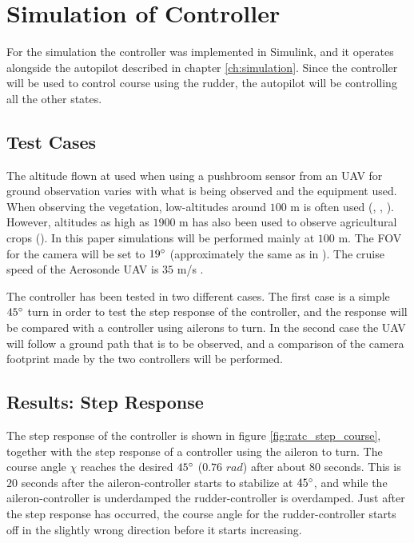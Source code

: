 \section{Simulation of Controller}
\label{ch:controller_sim}

For the simulation the controller was implemented in Simulink, and it operates alongside the autopilot described in chapter \ref{ch:simulation}. Since the controller will be used to control course using the rudder, the autopilot will be controlling all the other states.


\subsection{Test Cases}

The altitude flown at used when using a pushbroom sensor from an UAV for ground observation varies with what is being observed and the equipment used. When observing the vegetation, low-altitudes around $100$ m is often used (\cite{hymsySUOMALAINEN}, \cite{wheatLELONG}, \cite{lowRAMIREZ}). However, altitudes as high as $1900$ m has also been used to observe agricultural crops (\cite{mosaicASMAT}). In this paper simulations will be performed mainly at $100$ m. The FOV for the camera will be set to $19\degree$ (approximately the same as in \cite{hymsySUOMALAINEN}). The cruise speed of the Aerosonde UAV is $35$ m/s \cite{suaBEARD}.

The controller has been tested in two different cases. The first case is a simple $45\degree$ turn in order to test the step response of the controller, and the response will be compared with a controller using ailerons to turn. In the second case the UAV will follow a ground path that is to be observed, and a comparison of the camera footprint made by the two controllers will be performed.


\subsection{Results: Step Response}

The step response of the controller is shown in figure \ref{fig:ratc_step_course}, together with the step response of a controller using the aileron to turn. The course angle $\chi$ reaches the desired $45\degree$ ($0.76$ $rad$) after about $80$ seconds. This is $20$ seconds after the aileron-controller starts to stabilize at $45\degree$, and while the aileron-controller is underdamped the rudder-controller is overdamped. Just after the step response has occurred, the course angle for the rudder-controller starts off in the slightly wrong direction before it starts increasing.

